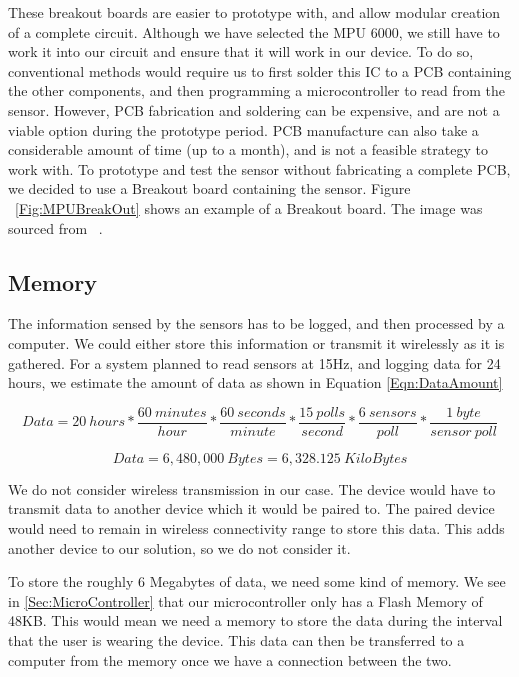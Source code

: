 These breakout boards are easier to prototype with, and allow modular creation of a complete circuit. Although we have selected the MPU 6000, we still have to work it into our circuit and ensure that it will work in our device. To do so, conventional methods would require us to first solder this IC to a PCB containing the other components, and then programming a microcontroller to read from the sensor. However, PCB fabrication and soldering can be expensive, and are not a viable option during the prototype period. PCB manufacture can also take a considerable amount of time (up to a month), and is not a feasible strategy to work with. To prototype and test the sensor without fabricating a complete PCB, we decided to use a Breakout board containing the sensor. Figure ~\ref{Fig:MPUBreakOut} shows an example of a Breakout board. The image was sourced from ~\cite{Web:SFBreakout}.

\subsection{Memory}
\label{Sec:Memory}

The information sensed by the sensors has to be logged, and then processed by a computer. We could either store this information or transmit it wirelessly as it is gathered. For a system planned to read sensors at 15Hz, and logging data for 24 hours, we estimate the amount of data as shown in Equation \ref{Eqn:DataAmount}

\begin{equation}
\label{Eqn:DataAmount}
Data = 20~hours * \dfrac{60~minutes}{hour} * \dfrac{60~seconds}{minute} * \dfrac{15~polls}{second} * \dfrac{6~sensors}{poll} * \dfrac{1~byte}{sensor~poll}
\end{equation}

\begin{equation}
\label{Eqn:DataAmount2}
Data = 6,480,000~Bytes = 6,328.125~KiloBytes
\end{equation}

We do not consider wireless transmission in our case. The device would have to transmit data to another device which it would be paired to. The paired device would need to remain in wireless connectivity range to store this data. This adds another device to our solution, so we do not consider it. 

To store the roughly 6 Megabytes of data, we need some kind of memory. We see in \ref{Sec:MicroController} that our microcontroller only has a Flash Memory of 48KB. This would mean we need a memory to store the data during the interval that the user is wearing the device. This data can then be transferred to a computer from the memory once we have a connection between the two.

